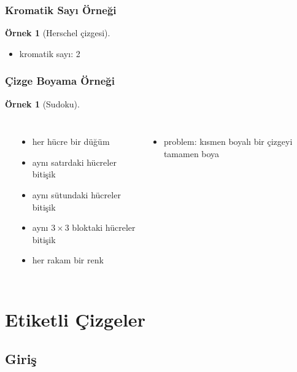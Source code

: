 \documentclass[dvipsnames]{beamer}
\theoremstyle{definition}
\theoremstyle{example}
\newtheorem{ornek}[theorem]{Örnek}
\theoremstyle{plain}
\begin{document}
\begin{frame}
  \frametitle{Kromatik Sayı Örneği}

  \begin{ornek}[Herschel çizgesi]
    \begin{center}
    \end{center}

    \begin{itemize}
      \item kromatik sayı: 2
    \end{itemize}
  \end{ornek}
\end{frame}

\begin{frame}
  \frametitle{Çizge Boyama Örneği}

  \begin{ornek}[Sudoku]
    \begin{columns}[t]
      \begin{center}
      \end{center}

      \begin{itemize}
        \item her hücre bir düğüm
        \item aynı satırdaki hücreler bitişik
        \item aynı sütundaki hücreler bitişik
        \item aynı $3 \times 3$ bloktaki hücreler bitişik
        \item her rakam bir renk
      \end{itemize}

      \pause
      \begin{itemize}
        \item problem: kısmen boyalı bir çizgeyi tamamen boya
      \end{itemize}
    \end{columns}
  \end{ornek}
\end{frame}

\section{Etiketli Çizgeler}

\subsection{Giriş}
\end{document}
